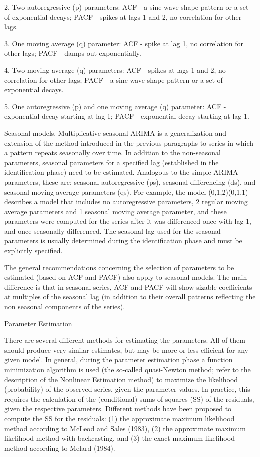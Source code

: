 2.
Two autoregressive (p) parameters: ACF - a sine-wave shape pattern or a set of exponential decays; PACF - spikes at lags 1 and 2, no correlation for other lags.

3.
One moving average (q) parameter: ACF - spike at lag 1, no correlation for other lags; PACF - damps out exponentially.

4.
Two moving average (q) parameters: ACF - spikes at lags 1 and 2, no correlation for other lags; PACF - a sine-wave shape pattern or a set of exponential decays.

5.
One autoregressive (p) and one moving average (q) parameter: ACF - exponential decay starting at lag 1; PACF - exponential decay starting at lag 1.


Seasonal models. Multiplicative seasonal ARIMA is a generalization and extension of the method introduced in the previous paragraphs to series in which a pattern repeats seasonally over time. In addition to the non-seasonal parameters, seasonal parameters for a specified lag (established in the identification phase) need to be estimated. Analogous to the simple ARIMA parameters, these are: seasonal autoregressive (ps), seasonal differencing (ds), and seasonal moving average parameters (qs). For example, the model (0,1,2)(0,1,1) describes a model that includes no autoregressive parameters, 2 regular moving average parameters and 1 seasonal moving average parameter, and these parameters were computed for the series after it was differenced once with lag 1, and once seasonally differenced. The seasonal lag used for the seasonal parameters is usually determined during the identification phase and must be explicitly specified.

The general recommendations concerning the selection of parameters to be estimated (based on ACF and PACF) also apply to seasonal models. The main difference is that in seasonal series, ACF and PACF will show sizable coefficients at multiples of the seasonal lag (in addition to their overall patterns reflecting the non seasonal components of the series).

Parameter Estimation

There are several different methods for estimating the parameters. All of them should produce very similar estimates, but may be more or less efficient for any given model. In general, during the parameter estimation phase a function minimization algorithm is used (the so-called quasi-Newton method; refer to the description of the Nonlinear Estimation method) to maximize the likelihood (probability) of the observed series, given the parameter values. In practice, this requires the calculation of the (conditional) sums of squares (SS) of the residuals, given the respective parameters. Different methods have been proposed to compute the SS for the residuals: (1) the approximate maximum likelihood method according to McLeod and Sales (1983), (2) the approximate maximum likelihood method with backcasting, and (3) the exact maximum likelihood method according to Melard (1984).


